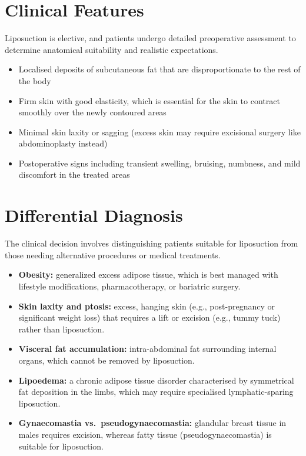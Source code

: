 \section*{Clinical Features}
Liposuction is elective, and patients undergo detailed preoperative assessment to determine anatomical suitability and realistic expectations.
\begin{itemize}
    \item Localised deposits of subcutaneous fat that are disproportionate to the rest of the body
    \item Firm skin with good elasticity, which is essential for the skin to contract smoothly over the newly contoured areas
    \item Minimal skin laxity or sagging (excess skin may require excisional surgery like abdominoplasty instead)
    \item Postoperative signs including transient swelling, bruising, numbness, and mild discomfort in the treated areas
\end{itemize}

\section*{Differential Diagnosis}
The clinical decision involves distinguishing patients suitable for liposuction from those needing alternative procedures or medical treatments.
\begin{itemize}
    \item \textbf{Obesity:} generalized excess adipose tissue, which is best managed with lifestyle modifications, pharmacotherapy, or bariatric surgery.
    \item \textbf{Skin laxity and ptosis:} excess, hanging skin (e.g., post-pregnancy or significant weight loss) that requires a lift or excision (e.g., tummy tuck) rather than liposuction.
    \item \textbf{Visceral fat accumulation:} intra-abdominal fat surrounding internal organs, which cannot be removed by liposuction.
    \item \textbf{Lipoedema:} a chronic adipose tissue disorder characterised by symmetrical fat deposition in the limbs, which may require specialised lymphatic-sparing liposuction.
    \item \textbf{Gynaecomastia vs.\ pseudogynaecomastia:} glandular breast tissue in males requires excision, whereas fatty tissue (pseudogynaecomastia) is suitable for liposuction.
\end{itemize}

